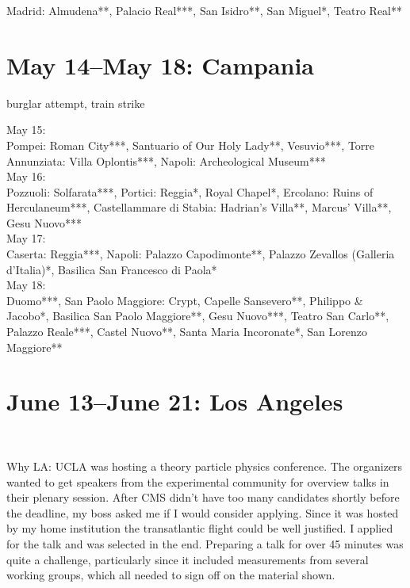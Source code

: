 Madrid:
Almudena**,
Palacio Real***,
San Isidro**,
San Miguel*,
Teatro Real**\\

\section{May 14--May 18: Campania}
\label{2015:Campania}

burglar attempt, train strike

May 15: \\
Pompei: Roman City***, Santuario of Our Holy Lady**, Vesuvio***, Torre Annunziata: Villa Oplontis***, Napoli: Archeological Museum***\\

May 16:\\
Pozzuoli: Solfarata***, Portici: Reggia*, Royal Chapel*, Ercolano: Ruins of Herculaneum***, Castellammare di Stabia: Hadrian's Villa**, Marcus' Villa**, Gesu Nuovo***\\

May 17:\\
Caserta: Reggia***, Napoli: Palazzo Capodimonte**, Palazzo Zevallos (Galleria d'Italia)*, Basilica San Francesco di Paola*\\

May 18:\\
Duomo***, San Paolo Maggiore: Crypt, Capelle Sansevero**, Philippo \& Jacobo*, Basilica San Paolo Maggiore**, Gesu Nuovo***, Teatro San Carlo**, Palazzo Reale***, Castel Nuovo**, Santa Maria Incoronate*, San Lorenzo Maggiore**

\section{June 13--June 21: Los Angeles}\
\label{LA2015}

Why LA: UCLA was hosting a theory particle physics conference. The organizers wanted to get speakers from the experimental community for overview talks in their plenary session. After CMS didn't have too many candidates shortly before the deadline, my boss asked me if I would consider applying. Since it was hosted by my home institution the transatlantic flight could be well justified. I applied for the talk and was selected in the end. Preparing a talk for over 45 minutes was quite a challenge, particularly since it included measurements from several working groups, which all needed to sign off on the material shown. \\


